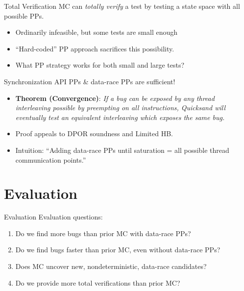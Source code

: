 \documentclass[xcolor=dvipsnames]{beamer}
\begin{document}
\begin{frame}{Total Verification}
	MC can {\em totally verify} a test by testing a state space with all possible PPs.
	\begin{itemize}
		\item Ordinarily infeasible, but some tests are small enough
		\item ``Hard-coded'' PP approach sacrifices this possibility.
		\item What PP strategy works for both small and large tests?
	\end{itemize}
	\pause
	\linegap

	Synchronization API PPs \& data-race PPs are sufficient!
	\begin{itemize}
		\item {\bf Theorem (Convergence)}:
			{\em If a bug can be exposed by any thread interleaving
				possible by preempting on all instructions,
			Quicksand will eventually test an equivalent interleaving which exposes the same bug.}
		\item Proof appeals to DPOR soundness and Limited HB.
		\item Intuition: ``Adding data-race PPs until saturation = all possible thread communication points.''
	\end{itemize}
\end{frame}



\section{Evaluation}


\begin{frame}{Evaluation}
	Evaluation questions:
	\begin{enumerate}
		\item Do we find more bugs than prior MC with data-race PPs?
		\item Do we find bugs faster than prior MC, even without data-race PPs?
		\item Does MC uncover new, nondeterministic, data-race candidates?
		\item Do we provide more total verifications than prior MC?
	\end{enumerate}
\end{frame}
\end{document}
